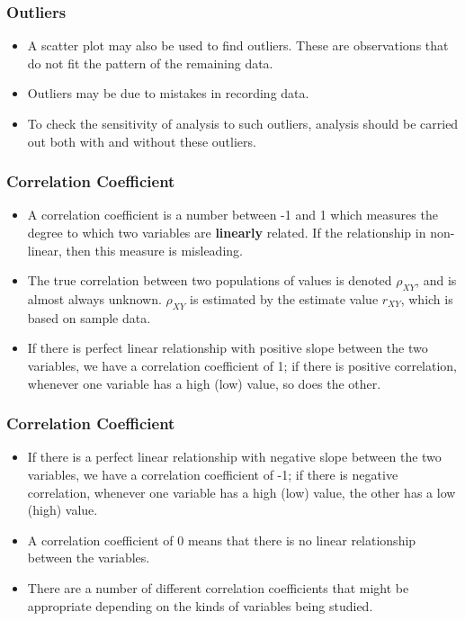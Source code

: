 \documentclass[a4]{beamer}
\begin{document}
\begin{frame}
\frametitle{Outliers}
\begin{itemize}
\item A scatter plot may also be used to find outliers. These are
observations that do not fit the pattern of the remaining data.
\item Outliers may be due to mistakes in recording data.
\item To check the sensitivity of analysis to such outliers, analysis should
be carried out both with and without these outliers.
\end{itemize}
\end{frame}





\begin{frame}
\frametitle{Correlation Coefficient}
\begin{itemize}
\item A correlation coefficient is a number between -1 and 1 which measures the degree to which two variables are \textbf{linearly} related. If the relationship in non-linear, then this measure is misleading.
\item The true correlation between two populations of values is denoted $\rho_{XY}$, and is almost always unknown. $\rho_{XY}$ is estimated by the estimate value $r_{XY}$, which is based on sample data.
\item If there is perfect linear relationship with positive slope between the two variables, we have a correlation coefficient of 1; if there is positive correlation, whenever one variable has a high (low) value, so does the other. 
\end{itemize}
\end{frame}

\begin{frame}
\frametitle{Correlation Coefficient}
\begin{itemize}
\item If there is a perfect linear relationship with negative slope between the two variables, we have a correlation coefficient of -1; if there is negative correlation, whenever one variable has a high (low) value, the other has a low (high) value.
        
\item A correlation coefficient of 0 means that there is no linear relationship between the variables.
\item There are a number of different correlation coefficients that might be appropriate depending on the kinds of variables being studied.
\end{itemize}
\end{frame}
\end{document}
